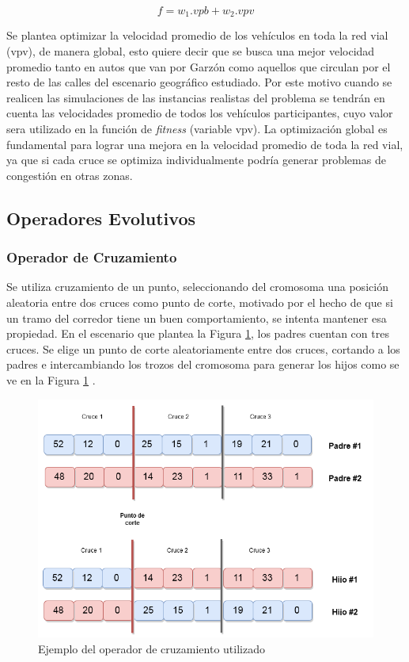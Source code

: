 \begin{equation}
\label{eq:funcion_fitness}
f = w_1.vpb + w_2.vpv
\end{equation}



Se plantea optimizar la velocidad promedio de los vehículos en toda la red vial (vpv), de manera global, esto quiere decir que se busca una mejor velocidad promedio tanto en autos que van por Garzón como aquellos que circulan por el resto de las calles del escenario geográfico estudiado. Por este motivo cuando se realicen las simulaciones de las instancias realistas del problema se tendrán en cuenta las velocidades promedio de todos los vehículos participantes, cuyo valor sera utilizado en la función de \emph{fitness} (variable vpv). La optimización global es fundamental para lograr una mejora en la velocidad promedio de toda la red vial, ya que si cada cruce se optimiza individualmente podría generar problemas de congestión en otras zonas.

\subsection{Operadores Evolutivos}

\subsubsection{Operador de Cruzamiento}
Se utiliza cruzamiento de un punto, seleccionando del cromosoma una posición aleatoria entre dos cruces como punto de corte, motivado por el hecho de que si un tramo del corredor tiene un buen comportamiento, se intenta mantener esa propiedad. En el escenario que plantea la Figura \ref{fig:op_cruzamiento}, los padres cuentan con tres cruces. Se elige un punto de corte aleatoriamente entre dos cruces, cortando a los padres e intercambiando los trozos del cromosoma para generar los hijos como se ve en la Figura \ref{fig:op_cruzamiento} .


\begin{figure}[H]
	\centering
	\includegraphics[width=0.8\linewidth]{Figures/alg_cruzamiento}
	\caption{Ejemplo del operador de cruzamiento utilizado}
	\label{fig:op_cruzamiento}
\end{figure}



